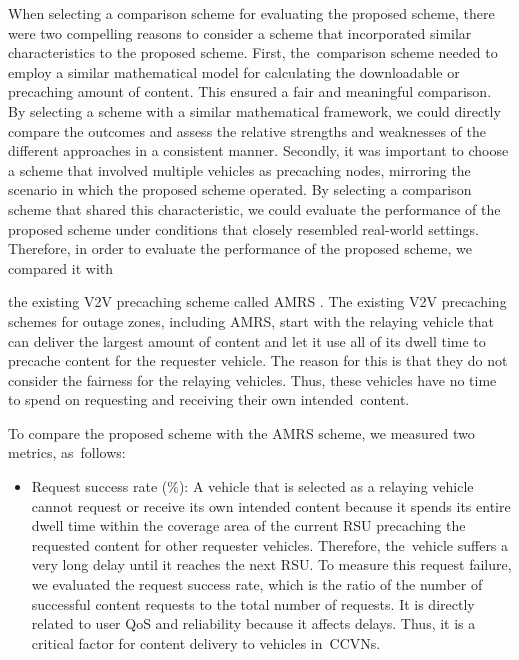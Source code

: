 \documentclass[sensors,aricle,accept,pdftex,moreauthors]{Definitions/mdpi}
\begin{document}
{When selecting a comparison scheme for evaluating the proposed scheme, there were two compelling reasons to consider a scheme that incorporated similar characteristics to the proposed scheme.
First, the~comparison scheme needed to employ a similar mathematical model for calculating the downloadable or precaching amount of content. This ensured a fair and meaningful comparison.
By selecting a scheme with a similar mathematical framework, we could directly compare the outcomes and assess the relative strengths and weaknesses of the different approaches in a consistent manner.
Secondly, it was important to choose a scheme that involved multiple vehicles as precaching nodes, mirroring the scenario in which the proposed scheme operated.
By selecting a comparison scheme that shared this characteristic, we could evaluate the performance of the proposed scheme under conditions that closely resembled real-world settings.
Therefore, i}n order to evaluate the performance of the proposed scheme, we compared it with {the existing V2V precaching scheme called AMRS \cite{Ahmed2018}.
The existing V2V precaching schemes for outage zones, including AMRS, start with the relaying vehicle that can deliver the largest amount of content and let it use all of its dwell time to precache content for the requester vehicle.
The reason for this is that they do not consider the fairness for the relaying vehicles.
Thus, these vehicles have no time to spend on requesting and receiving their own intended~content.


To compare the proposed scheme with the AMRS scheme, we measured two metrics, as~follows:
\begin{itemize} %
    \item Request success rate ($\%$):
    A vehicle that is selected as a relaying vehicle cannot request or receive its own intended content because it spends its entire dwell time within the coverage area of the current RSU precaching the requested content for other requester vehicles.
    Therefore, the~vehicle suffers a very long delay until it reaches the next RSU.
    To measure this request failure, we evaluated the request success rate, which is the ratio of the number of successful content requests to the total number of requests.
    It is directly related to user QoS and reliability because it affects delays.
    Thus, it is a critical factor for content delivery to vehicles in~CCVNs.
    

\end{itemize}}
\end{document}
